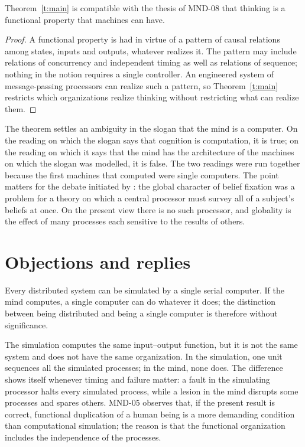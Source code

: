\documentclass{situationist-preprint}
\begin{document}
\begin{corollary}\label{c:func}
Theorem~\ref{t:main} is compatible with the thesis of MND-08 that thinking is a functional property that machines can have.
\end{corollary}

\begin{proof}
A functional property is had in virtue of a pattern of causal relations among states, inputs and outputs, whatever realizes it. The pattern may include relations of concurrency and independent timing as well as relations of sequence; nothing in the notion requires a single controller. An engineered system of message-passing processors can realize such a pattern, so Theorem~\ref{t:main} restricts which organizations realize thinking without restricting what can realize them.
\end{proof}

The theorem settles an ambiguity in the slogan that the mind is a computer. On the reading on which the slogan says that cognition is computation, it is true; on the reading on which it says that the mind has the architecture of the machines on which the slogan was modelled, it is false. The two readings were run together because the first machines that computed were single computers. The point matters for the debate initiated by \citet{Fodor2000}: the global character of belief fixation was a problem for a theory on which a central processor must survey all of a subject's beliefs at once. On the present view there is no such processor, and globality is the effect of many processes each sensitive to the results of others.

\section{Objections and replies}

\begin{objection}[Simulation]
Every distributed system can be simulated by a single serial computer. If the mind computes, a single computer can do whatever it does; the distinction between being distributed and being a single computer is therefore without significance.
\end{objection}

\begin{reply}
The simulation computes the same input--output function, but it is not the same system and does not have the same organization. In the simulation, one unit sequences all the simulated processes; in the mind, none does. The difference shows itself whenever timing and failure matter: a fault in the simulating processor halts every simulated process, while a lesion in the mind disrupts some processes and spares others. MND-05 observes that, if the present result is correct, functional duplication of a human being is a more demanding condition than computational simulation; the reason is that the functional organization includes the independence of the processes.
\end{reply}
\end{document}
